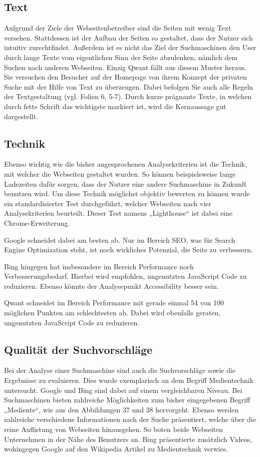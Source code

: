\documentclass[11pt]{article}
\begin{document}
\subsection{Text}
Aufgrund der Ziele der Webseitenbetreiber sind die Seiten mit wenig Text versehen. Stattdessen ist der Aufbau der Seiten
so gestaltet, dass der Nutzer sich intuitiv zurechtfindet. Außerdem ist es nicht das Ziel der Suchmaschinen den User durch
lange Texte vom eigentlichen Sinn der Seite abzulenken, nämlich dem Suchen nach anderen Webseiten. Einzig Qwant fällt aus
diesem Muster heraus. Sie versuchen den Besucher auf der Homepage von ihrem Konzept der privaten Suche mit der Hilfe von
Text zu überzeugen. Dabei befolgen Sie auch alle Regeln der Textgestaltung (vgl. Folien 6, 5-7). Durch kurze prägnante Texte,
in welchen durch fette Schrift das wichtigste markiert ist, wird die Kernaussage gut dargestellt.

\subsection{Technik}
Ebenso wichtig wie die bisher angesprochenen Analysekriterien ist die Technik, mit welcher die Webseiten gestaltet wurden.
So können beispielsweise lange Ladezeiten dafür sorgen, dass der Nutzer eine andere Suchmaschine in Zukunft benutzen wird.
Um diese Technik möglichst objektiv bewerten zu können wurde ein standardisierter Test durchgeführt, welcher Webseiten nach
vier Analysekriterien beurteilt. Dieser Test namens „Lighthouse“ ist dabei eine Chrome-Erweiterung.

Google schneidet dabei am besten ab. Nur im Bereich SEO, was für Search Engine Optimization steht, ist noch wirkliches
Potenzial, die Seite zu verbessern.

Bing hingegen hat insbesondere im Bereich Performance noch Verbesserungsbedarf. Hierbei wird empfohlen, ungenutzten JavaScript
Code zu reduzieren. Ebenso könnte der Analysepunkt Accessibility besser sein.

Qwant schneidet im Bereich Performance mit gerade einmal 54 von 100 möglichen Punkten am schlechtesten ab. Dabei wird ebenfalls
geraten, ungenutzten JavaScript Code zu reduzieren.

\subsection{Qualität der Suchvorschläge}
Bei der Analyse einer Suchmaschine sind auch die Suchvorschläge sowie die Ergebnisse zu evaluieren. Dies wurde exemplarisch
an dem Begriff Medientechnik untersucht. Google und Bing sind dabei auf einem vergleichbaren Niveau. Bei Suchmaschinen
bieten zahlreiche Möglichkeiten zum bisher eingegebenen Begriff „Mediente“, wie aus den Abbildungen 37 und 38 hervorgeht.
Ebenso werden zahlreiche verschiedene Informationen nach der Suche präsentiert, welche über die reine Auflistung von Webseiten
hinausgehen. So boten beide Webseiten Unternehmen in der Nähe des Benutzers an. Bing präsentierte zusätzlich Videos, wohingegen
Google auf den Wikipedia Artikel zu Medientechnik verwies.
\end{document}
